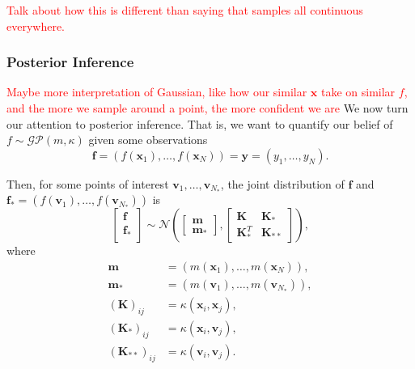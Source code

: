 \textcolor{red}{Talk about how this is different than saying that samples all continuous everywhere.}

\subsubsection{Posterior Inference}\label{sssec:post-inf}

\textcolor{red}{Maybe more interpretation of Gaussian, like how our similar $\mathbf{x}$ take on similar $f$, and the more we sample around a point, the more confident we are}
We now turn our attention to posterior inference.
That is, we want to quantify our belief of $f \sim \mathcal{GP}(m, \kappa)$ given some observations
\begin{equation*}
    \mathbf{f} = (f(\mathbf{x}_1), \dots, f(\mathbf{x}_N)) = \mathbf{y} = (y_1, \dots, y_N).
\end{equation*}

Then, for some points of interest $\mathbf{v}_{1}, \dots, \mathbf{v}_{N_{*}}$, the joint distribution of $\mathbf{f}$ and $\mathbf{f}_* = (f(\mathbf{v}_1), \dots, f(\mathbf{v}_{N_*}))$ is
\begin{equation*}
    \begin{bmatrix}
        \mathbf{f} \\
        \mathbf{f}_{*} \\
    \end{bmatrix}
    \sim
    \mathcal{N}\left(
    \begin{bmatrix}
            \mathbf{m} \\
            \mathbf{m}_{*}
        \end{bmatrix}
    ,
    \begin{bmatrix}
            \mathbf{K} & \mathbf{K}_* \\
            \mathbf{K}_*^T & \mathbf{K}_{* *}
        \end{bmatrix}
    \right),
\end{equation*}
where
\begin{align*}
    \mathbf{m} & = (m(\mathbf{x}_1), \dots, m(\mathbf{x}_N)), \\
    \mathbf{m_*} & = (m(\mathbf{v}_1), \dots, m(\mathbf{v}_{N_{*}})), \\
    (\mathbf{K})_{ij} & = \kappa(\mathbf{x}_i, \mathbf{x}_j), \\
    (\mathbf{K}_*)_{ij} & = \kappa(\mathbf{x}_i, \mathbf{v}_j), \\
    (\mathbf{K}_{* *})_{ij} & = \kappa(\mathbf{v}_i, \mathbf{v}_j).
\end{align*}

